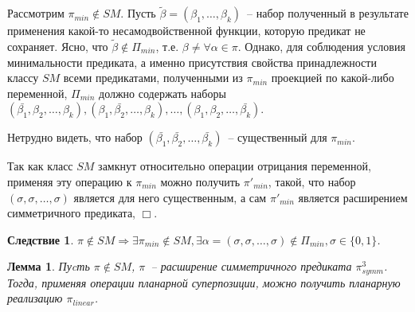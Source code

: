 \documentclass[12pt]{article}
\newtheorem{lemma}[theorem]{Лемма}
\newtheorem{corollary}[theorem]{Следствие}
\newenvironment{proof}[1][Доказательство]{\begin{trivlist}
\item[\hskip \labelsep {\bfseries #1}]}{\end{trivlist}}
\begin{document}
\begin{proof}
Рассмотрим $\pi_{min} \notin SM$. Пусть $\widetilde{\beta} = (\beta_1, \dots, \beta_k)$~-- набор полученный в результате
применения какой-то несамодвойственной функции, которую предикат не сохраняет.
Ясно, что $\widetilde{\beta} \notin \Pi_{min}$, т.е. $\beta \neq \forall \alpha \in \pi$. Однако, для соблюдения условия 
минимальности предиката, а именно присутствия свойства принадлежности классу $SM$ всеми предикатами, полученными
из $\pi_{min}$ проекцией по какой-либо переменной,
$\Pi_{min}$ должно содержать наборы 
$(\bar{\beta_1}, \beta_2, \dots, \beta_k), (\beta_1, \bar{\beta_2}, \dots, \beta_k), \dots, (\beta_1, \beta_2, \dots, \bar{\beta_k})$.

Нетрудно видеть, что набор $(\bar{\beta_1}, \bar{\beta_2}, \dots, \bar{\beta_k})$~-- существенный для $\pi_{min}$.

Так как класс $SM$ замкнут относительно операции отрицания переменной,
применяя эту операцию к $\pi_{min}$ можно получить $\pi'_{min}$,
такой, что набор $(\sigma, \sigma, \dots, \sigma)$ является для него существенным, а сам $\pi'_{min}$ является расширением 
симметричного предиката, $\Box$.
\end{proof}

\begin{corollary}
\label{lemma_sm_corollary}
$\pi \notin SM \Longrightarrow \exists \pi_{min} \notin SM, \exists 
\alpha = (\sigma, \sigma, \dots, \sigma) \notin \Pi_{min}, \sigma \in \{0, 1\}$.
\end{corollary}

\begin{lemma}
\label{eq:super_new}
Пуcть $\pi \notin SM$, $\pi$~-- расширение симметричного предиката $\pi_{symm}^3$. 
Тогда, применяя операции планарной суперпозиции, можно получить планарную реализацию $\pi_{linear}$.
\end{lemma}
\end{document}
